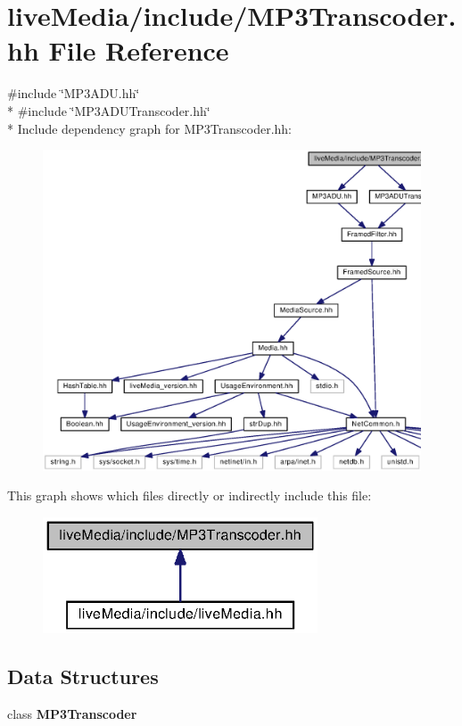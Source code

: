 \section{live\+Media/include/\+M\+P3\+Transcoder.hh File Reference}
\label{MP3Transcoder_8hh}
{\ttfamily \#include \char`\"{}M\+P3\+A\+D\+U.\+hh\char`\"{}}\\*
{\ttfamily \#include \char`\"{}M\+P3\+A\+D\+U\+Transcoder.\+hh\char`\"{}}\\*
Include dependency graph for M\+P3\+Transcoder.\+hh\+:
\nopagebreak
\begin{figure}[H]
\begin{center}
\leavevmode
\includegraphics[width=350pt]{MP3Transcoder_8hh__incl}
\end{center}
\end{figure}
This graph shows which files directly or indirectly include this file\+:
\nopagebreak
\begin{figure}[H]
\begin{center}
\leavevmode
\includegraphics[width=231pt]{MP3Transcoder_8hh__dep__incl}
\end{center}
\end{figure}
\subsection*{Data Structures}
\begin{DoxyCompactItemize}
\item 
class {\bf M\+P3\+Transcoder}
\end{DoxyCompactItemize}

